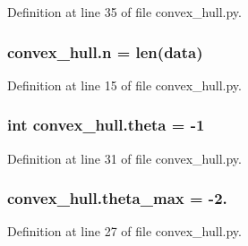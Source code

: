 Definition at line 35 of file convex\+\_\+hull.\+py.

\subsubsection[{\texorpdfstring{n}{n}}]{\setlength{\rightskip}{0pt plus 5cm}convex\+\_\+hull.\+n = len({\bf data})}\hypertarget{namespaceconvex__hull_ac5465861527a4ef8e879c3a49cbd8766}{}\label{namespaceconvex__hull_ac5465861527a4ef8e879c3a49cbd8766}


Definition at line 15 of file convex\+\_\+hull.\+py.

\subsubsection[{\texorpdfstring{theta}{theta}}]{\setlength{\rightskip}{0pt plus 5cm}int convex\+\_\+hull.\+theta = -\/1}\hypertarget{namespaceconvex__hull_ab8272752257e642cd8986e8d229cfea8}{}\label{namespaceconvex__hull_ab8272752257e642cd8986e8d229cfea8}


Definition at line 31 of file convex\+\_\+hull.\+py.

\subsubsection[{\texorpdfstring{theta\+\_\+max}{theta_max}}]{\setlength{\rightskip}{0pt plus 5cm}convex\+\_\+hull.\+theta\+\_\+max = -\/2.}\hypertarget{namespaceconvex__hull_a4611cf1c26d3efe788cd6e21b786cd0c}{}\label{namespaceconvex__hull_a4611cf1c26d3efe788cd6e21b786cd0c}


Definition at line 27 of file convex\+\_\+hull.\+py.

